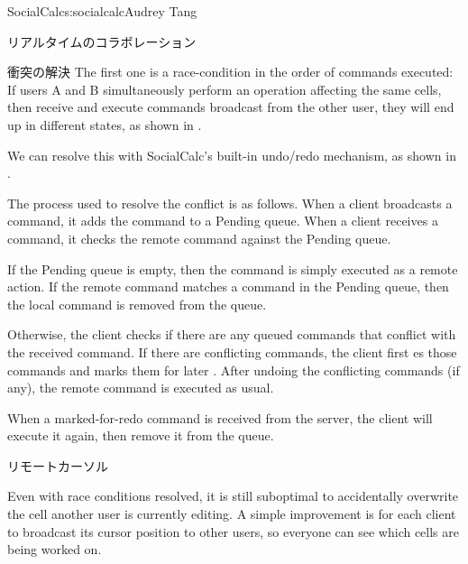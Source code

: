 \begin{aosachapter}{SocialCalc}{s:socialcalc}{Audrey Tang}
\begin{aosasect1}{リアルタイムのコラボレーション}
\begin{aosasect2}{衝突の解決}
The first one is a race-condition in the order of commands executed:
If users A and B simultaneously perform an operation affecting the
same cells, then receive and execute commands broadcast from the other
user, they will end up in different states, as shown in
.


We can resolve this with SocialCalc's built-in undo/redo mechanism, as
shown in .


The process used to resolve the conflict is as follows.  When a client
broadcasts a command, it adds the command to a Pending queue.  When a client
receives a command, it checks the remote command against the Pending queue.

If the Pending queue is empty, then the command is simply executed as a remote
action. If the remote command matches a command in the Pending queue, then the
local command is removed from the queue.

Otherwise, the client checks if there are any queued commands that conflict
with the received command.  If there are conflicting commands, the client first
es those commands and marks them for later .  After
undoing the conflicting commands (if any), the remote command is executed as
usual.

When a marked-for-redo command is received from the server, the client will
execute it again, then remove it from the queue.


\end{aosasect2}

\begin{aosasect2}{リモートカーソル}

Even with race conditions resolved, it is still suboptimal to
accidentally overwrite the cell another user is currently editing.  A
simple improvement is for each client to broadcast its cursor position
to other users, so everyone can see which cells are being worked on.


\end{aosasect2}
\end{aosasect1}
\end{aosachapter}
